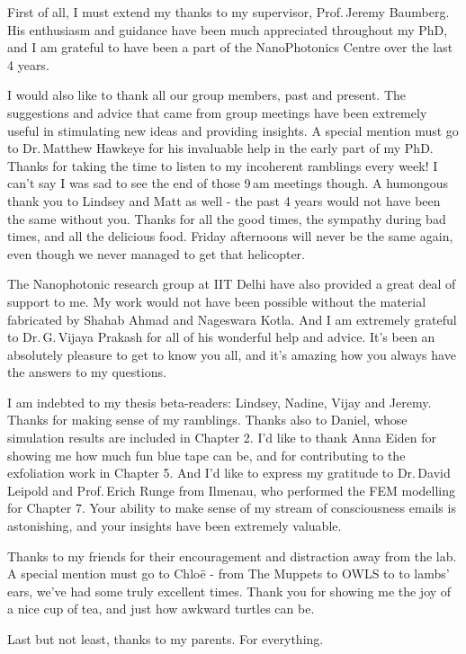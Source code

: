 
\begin{acknowledgements}      
\noindent First of all, I must extend my thanks to my supervisor, Prof.\,Jeremy Baumberg. His enthusiasm and guidance have been much appreciated throughout my PhD, and I am grateful to have been a part of the NanoPhotonics Centre over the last 4 years.

I would also like to thank all our group members, past and present. The suggestions and advice that came from group meetings have been extremely useful in stimulating new ideas and providing insights. A special mention must go to Dr.\,Matthew Hawkeye for his invaluable help in the early part of my PhD. Thanks for taking the time to listen to my incoherent ramblings every week! I can't say I was sad to see the end of those 9\,am meetings though. A humongous thank you to Lindsey and Matt as well - the past 4 years would not have been the same without you. Thanks for all the good times, the sympathy during bad times, and all the delicious food. Friday afternoons will never be the same again, even though we never managed to get that helicopter.

The Nanophotonic research group at IIT Delhi have also provided a great deal of support to me. My work would not have been possible without the material fabricated by Shahab Ahmad and Nageswara Kotla. And I am extremely grateful to Dr.\,G.\,Vijaya Prakash for all of his wonderful help and advice. It's been an absolutely pleasure to get to know you all, and it's amazing how you always have the answers to my questions.

I am indebted to my thesis beta-readers: Lindsey, Nadine, Vijay and Jeremy. Thanks for making sense of my ramblings. Thanks also to Daniel, whose simulation results are included in Chapter 2. I'd like to thank Anna Eiden for showing me how much fun blue tape can be, and for contributing to the exfoliation work in Chapter 5. And I'd like to express my gratitude to Dr.\,David Leipold and Prof.\,Erich Runge from Ilmenau, who performed the FEM modelling for Chapter 7. Your ability to make sense of my stream of consciousness emails is astonishing, and your insights have been extremely valuable.

Thanks to my friends for their encouragement and distraction away from the lab. A special mention must go to Chlo{\"e} - from The Muppets to OWLS to to lambs' ears, we've had some truly excellent times. Thank you for showing me the joy of a nice cup of tea, and just how awkward turtles can be. 

Last but not least, thanks to my parents. For everything.
\end{acknowledgements}
